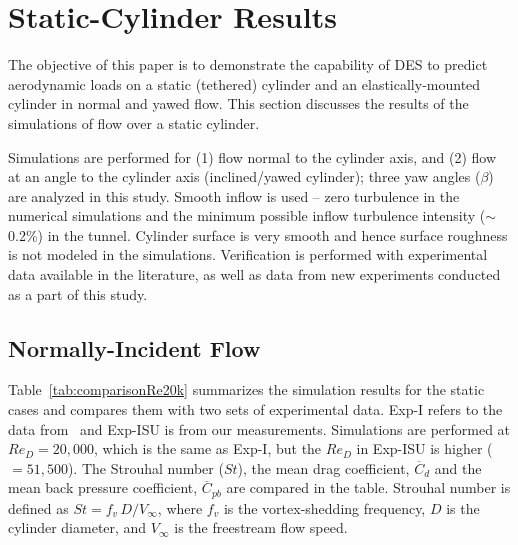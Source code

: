 \section{Static-Cylinder Results}
\label{sec:comp_results}
%
The objective of this paper is to demonstrate the capability of DES to predict
aerodynamic loads on a static (tethered) cylinder and an elastically-mounted
cylinder in normal and yawed flow.  This section discusses the results of the
simulations of flow over a static cylinder.

Simulations are performed for (1) flow normal to the cylinder axis, and (2)
flow at an angle to the cylinder axis (inclined/yawed cylinder); three yaw
angles ($\beta$) are analyzed in this study. Smooth inflow is used -- zero
turbulence in the numerical simulations and the minimum possible inflow
turbulence intensity ($\sim$0.2\%) in the tunnel. Cylinder surface is very
smooth and hence surface roughness is not modeled in the simulations.
Verification is performed with experimental data available in the literature,
as well as data from new experiments conducted as a part of this study.

\subsection{Normally-Incident Flow}
\label{sec:normally_incident}
%
Table~\ref{tab:comparisonRe20k} summarizes the simulation results for the
static cases and compares them with two sets of experimental data. Exp-I refers
to the data from~\cite{norberg2013pressure} and Exp-ISU is from our
measurements. Simulations are performed at $Re_D=20,000$, which is the same as
Exp-I, but the $Re_D$ in Exp-ISU is higher ($=51,500$).  The Strouhal number
($St$), the mean drag coefficient, $\overline{C}_d$ and the mean back pressure
coefficient, $\overline{C}_{pb}$ are compared in the table. Strouhal number is
defined as $St = f_v\,D/V_\infty$, where $f_v$ is the vortex-shedding
frequency, $D$ is the cylinder diameter, and $V_\infty$ is the freestream flow
speed.

